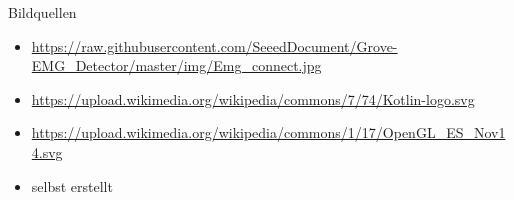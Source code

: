 \documentclass[hyphens]{beamer}
\begin{document}
 \begin{frame}{Bildquellen}
 \begin{itemize}
 \item \small{\url{https://raw.githubusercontent.com/SeeedDocument/Grove-EMG_Detector/master/img/Emg_connect.jpg}}
 \item \small{\url{https://upload.wikimedia.org/wikipedia/commons/7/74/Kotlin-logo.svg}}
 \item \small{\url{https://upload.wikimedia.org/wikipedia/commons/1/17/OpenGL_ES_Nov14.svg}}
 \item \small{selbst erstellt}
 \end{itemize}
 \end{frame}

 \begin{frame}
 \titlepage
 \end{frame}
\end{document}
